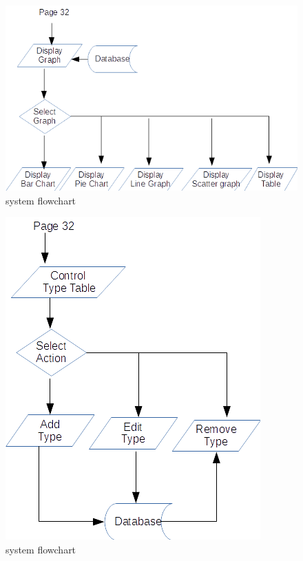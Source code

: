 \begin{figure}[H]
\includegraphics{./design/flowchart 3.png}
\caption{system flowchart}
\end{figure}

\begin{figure}[H]
\includegraphics{./design/flowchart 2.png}
\caption{system flowchart}
\end{figure}

